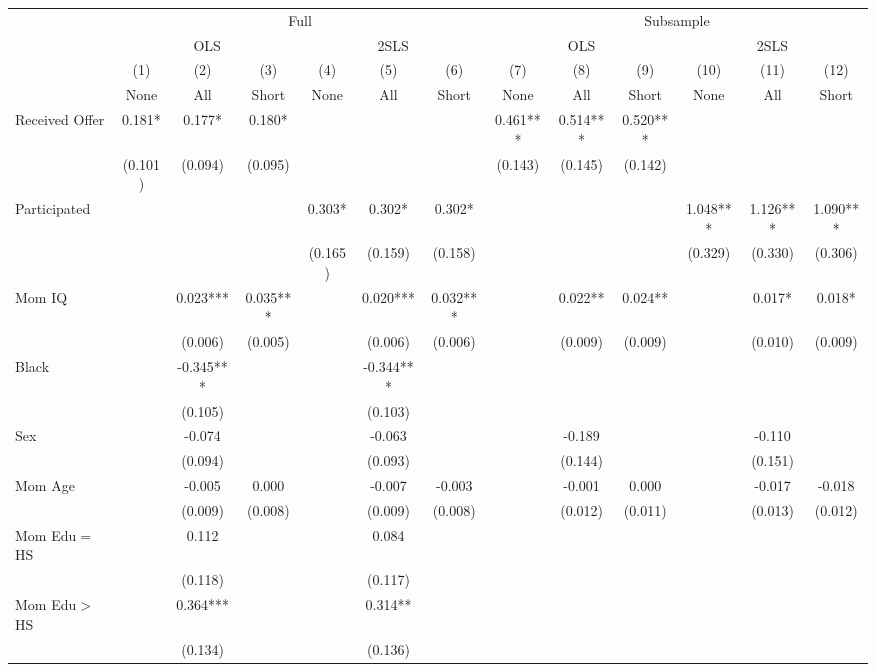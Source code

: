 \begin{tabular}{lcccccccccccc}
\toprule 
\midrule 
 & \multicolumn{6}{c}{Full} & \multicolumn{6}{c}{Subsample} \\
 \cmidrule(lr){2-7} \cmidrule(lr){8-13} 
 & \multicolumn{3}{c}{OLS} & \multicolumn{3}{c}{2SLS} & \multicolumn{3}{c}{OLS} & \multicolumn{3}{c}{2SLS} \\
 \cmidrule(lr){2-4} \cmidrule(lr){5-7} \cmidrule(lr){8-10} \cmidrule(lr){11-13} 
 & (1) & (2) & (3) & (4) & (5) & (6) & (7) & (8) & (9) & (10) & (11) & (12) \\
 & None & All & Short & None & All & Short & None & All & Short & None & All & Short \\
\midrule 
Received Offer & 0.181* & 0.177* & 0.180* &  &  &  & 0.461*** & 0.514*** & 0.520*** &  &  &  \\
 & (0.101) & (0.094) & (0.095) &  &  &  & (0.143) & (0.145) & (0.142) &  &  &  \\
Participated &  &  &  & 0.303* & 0.302* & 0.302* &  &  &  & 1.048*** & 1.126*** & 1.090*** \\
 &  &  &  & (0.165) & (0.159) & (0.158) &  &  &  & (0.329) & (0.330) & (0.306) \\
Mom IQ &  & 0.023*** & 0.035*** &  & 0.020*** & 0.032*** &  & 0.022** & 0.024** &  & 0.017* & 0.018* \\
 &  & (0.006) & (0.005) &  & (0.006) & (0.006) &  & (0.009) & (0.009) &  & (0.010) & (0.009) \\
Black &  & -0.345*** &  &  & -0.344*** &  &  &  &  &  &  &  \\
 &  & (0.105) &  &  & (0.103) &  &  &  &  &  &  &  \\
Sex &  & -0.074 &  &  & -0.063 &  &  & -0.189 &  &  & -0.110 &  \\
 &  & (0.094) &  &  & (0.093) &  &  & (0.144) &  &  & (0.151) &  \\
Mom Age &  & -0.005 & 0.000 &  & -0.007 & -0.003 &  & -0.001 & 0.000 &  & -0.017 & -0.018 \\
 &  & (0.009) & (0.008) &  & (0.009) & (0.008) &  & (0.012) & (0.011) &  & (0.013) & (0.012) \\
Mom Edu$=$HS &  & 0.112 &  &  & 0.084 &  &  &  &  &  &  &  \\
 &  & (0.118) &  &  & (0.117) &  &  &  &  &  &  &  \\
Mom Edu$>$HS &  & 0.364*** &  &  & 0.314** &  &  &  &  &  &  &  \\
 &  & (0.134) &  &  & (0.136) &  &  &  &  &  &  &  \\

\end{tabular}

